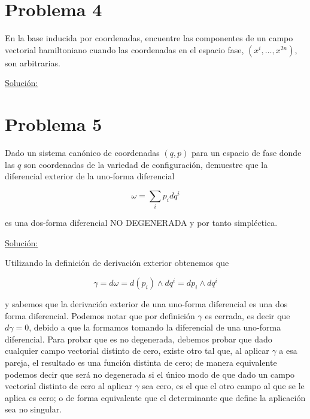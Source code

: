 \documentclass[a4paper,10pt]{article}
\numberwithin{equation}{section}
\begin{document}
\section{Problema 4}

En la base inducida por coordenadas, encuentre las componentes de un campo vectorial 
hamiltoniano cuando las coordenadas en el espacio fase, $(x^i,\dots,x^{2n})$, son 
arbitrarias.

\vspace{.3cm}

\underline{Solución:} \vspace{.3cm}

\section{Problema 5}

Dado un sistema canónico de coordenadas $(q,p)$ para un espacio de fase donde las $q$ 
son coordenadas de la variedad de configuración, demuestre que la diferencial exterior 
de la uno-forma diferencial 

$$
\omega = \sum_i p_idq^i
$$

es una dos-forma diferencial NO DEGENERADA y por tanto simpléctica.

\vspace{.3cm}

\underline{Solución:} \vspace{.3cm}

Utilizando la definición de derivación exterior obtenemos que 

\begin{equation}
 \gamma = d\omega = d(p_i) \wedge dq^i = dp_i \wedge dq^i
\end{equation}

y sabemos que la derivación exterior de una uno-forma diferencial es una dos forma 
diferencial. Podemos notar que por definición $\gamma$ es cerrada, es decir que 
$d\gamma = 0$, debido a que la formamos tomando la diferencial de una uno-forma 
diferencial. Para probar que es no degenerada, debemos probar que dado cualquier 
campo vectorial distinto de cero, existe otro tal que, al aplicar $\gamma$ a esa pareja, 
el resultado es una función distinta de cero; de manera equivalente podemos decir 
que será no degenerada si el único modo de que dado un campo vectorial distinto de 
cero al aplicar $\gamma$ sea cero, es el que el otro campo al que se le aplica 
es cero; o de forma equivalente que el determinante que define la aplicación 
sea no singular. 
\end{document}
